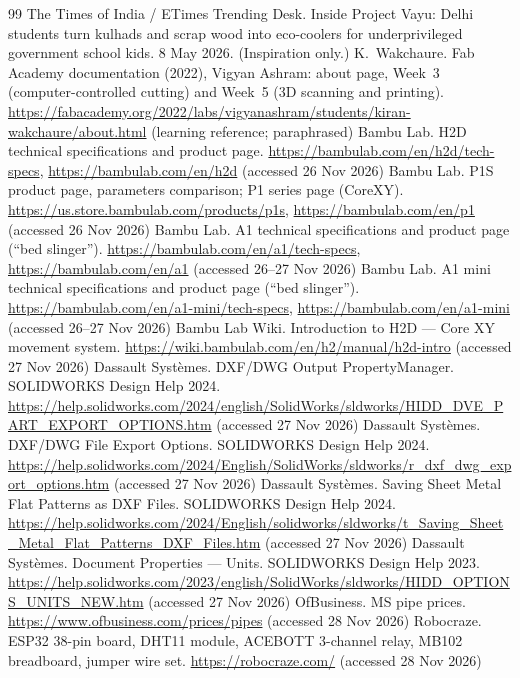 \documentclass[11pt,a4paper]{report}
\begin{document}
\begin{thebibliography}{99}
 The Times of India / ETimes Trending Desk. Inside Project Vayu: Delhi students turn kulhads and scrap wood into eco-coolers for underprivileged government school kids. 8 May 2026. (Inspiration only.)
 K.~Wakchaure. Fab Academy documentation (2022), Vigyan Ashram: about page, Week~3 (computer-controlled cutting) and Week~5 (3D scanning and printing). \url{https://fabacademy.org/2022/labs/vigyanashram/students/kiran-wakchaure/about.html} (learning reference; paraphrased)
 Bambu Lab. H2D technical specifications and product page. \url{https://bambulab.com/en/h2d/tech-specs}, \url{https://bambulab.com/en/h2d} (accessed 26 Nov 2026)
 Bambu Lab. P1S product page, parameters comparison; P1 series page (CoreXY). \url{https://us.store.bambulab.com/products/p1s}, \url{https://bambulab.com/en/p1} (accessed 26 Nov 2026)
 Bambu Lab. A1 technical specifications and product page (``bed slinger''). \url{https://bambulab.com/en/a1/tech-specs}, \url{https://bambulab.com/en/a1} (accessed 26--27 Nov 2026)
 Bambu Lab. A1 mini technical specifications and product page (``bed slinger''). \url{https://bambulab.com/en/a1-mini/tech-specs}, \url{https://bambulab.com/en/a1-mini} (accessed 26--27 Nov 2026)
 Bambu Lab Wiki. Introduction to H2D --- Core XY movement system. \url{https://wiki.bambulab.com/en/h2/manual/h2d-intro} (accessed 27 Nov 2026)
 Dassault Syst\`emes. DXF/DWG Output PropertyManager. SOLIDWORKS Design Help 2024. \url{https://help.solidworks.com/2024/english/SolidWorks/sldworks/HIDD_DVE_PART_EXPORT_OPTIONS.htm} (accessed 27 Nov 2026)
 Dassault Syst\`emes. DXF/DWG File Export Options. SOLIDWORKS Design Help 2024. \url{https://help.solidworks.com/2024/English/SolidWorks/sldworks/r_dxf_dwg_export_options.htm} (accessed 27 Nov 2026)
 Dassault Syst\`emes. Saving Sheet Metal Flat Patterns as DXF Files. SOLIDWORKS Design Help 2024. \url{https://help.solidworks.com/2024/English/solidworks/sldworks/t_Saving_Sheet_Metal_Flat_Patterns_DXF_Files.htm} (accessed 27 Nov 2026)
 Dassault Syst\`emes. Document Properties --- Units. SOLIDWORKS Design Help 2023. \url{https://help.solidworks.com/2023/english/SolidWorks/sldworks/HIDD_OPTIONS_UNITS_NEW.htm} (accessed 27 Nov 2026)
 OfBusiness. MS pipe prices. \url{https://www.ofbusiness.com/prices/pipes} (accessed 28 Nov 2026)
 Robocraze. ESP32 38-pin board, DHT11 module, ACEBOTT 3-channel relay, MB102 breadboard, jumper wire set. \url{https://robocraze.com/} (accessed 28 Nov 2026)

\end{thebibliography}
\end{document}
